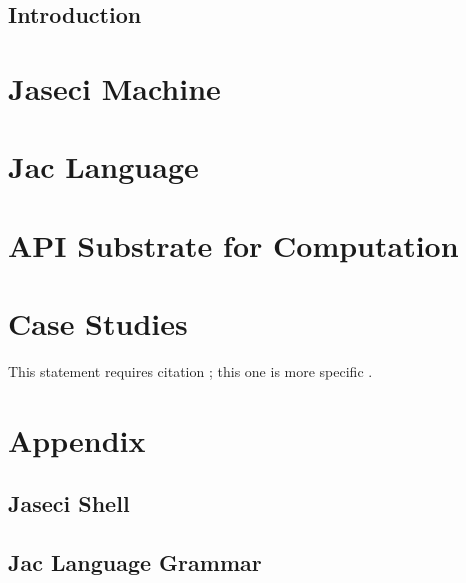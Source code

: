 \documentclass[11pt,fleqn,openany]{book} %
\begin{document}


\pagestyle{empty} %

\tableofcontents %


\pagestyle{fancy} %


\chapter{Introduction}
\part{Jaseci Machine}
\part{Jac Language}
\part{API Substrate for Computation}
\part{Case Studies}

This statement requires citation \cite{article_key}; this one is more specific \cite[162]{book_key}.

\appendix\part{Appendix}
\chapter{Jaseci Shell}
\chapter{Jac Language Grammar}
\end{document}
